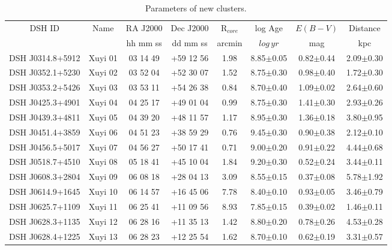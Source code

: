 \documentclass[]{raa_rb}
\begin{document}
\begin{table*}
\centering
\begin{minipage}{140mm}
\caption{Parameters of new clusters.}
\label{clusters_new}
\begin{tabular}{c|c|c|c|c|c|c|c}
\hline
\hline
  DSH ID          & Name        & RA J2000 & Dec J2000  &R$_{core}$& log Age           & $E(B-V)$      & Distance          \\ 
                  &             & hh mm ss &  dd mm ss  &arcmin& $log\,yr$       &  mag          & kpc               \\ \hline
DSH J0314.8+5912  & Xuyi 01     & 03 14 49 &  +59 12 56 & 1.98 & 8.85$\pm$0.05 & 0.82$\pm$0.44 &  2.09$\pm$0.30  \\
DSH J0352.1+5230  & Xuyi 02     & 03 52 04 &  +52 30 07 & 1.52 & 8.75$\pm$0.30 & 0.98$\pm$0.40 &  1.72$\pm$0.30  \\
DSH J0353.2+5426  & Xuyi 03     & 03 53 11 &  +54 26 38 & 0.84 & 8.70$\pm$0.40 & 1.09$\pm$0.02 &  2.64$\pm$0.60  \\
DSH J0425.3+4901  & Xuyi 04     & 04 25 17 &  +49 01 04 & 0.99 & 8.75$\pm$0.30 & 1.41$\pm$0.30 &  2.93$\pm$0.26  \\
DSH J0439.3+4811  & Xuyi 05     & 04 39 20 &  +48 11 57 & 1.17 & 8.95$\pm$0.30 & 1.36$\pm$0.18 &  3.80$\pm$0.95  \\
DSH J0451.4+3859  & Xuyi 06     & 04 51 23 &  +38 59 29 & 0.76 & 9.45$\pm$0.30 & 0.90$\pm$0.38 &  2.12$\pm$0.10  \\
DSH J0456.5+5017  & Xuyi 07     & 04 56 27 &  +50 17 41 & 0.71 & 9.00$\pm$0.20 & 0.91$\pm$0.22 &  4.44$\pm$0.68  \\
DSH J0518.7+4510  & Xuyi 08     & 05 18 41 &  +45 10 04 & 1.84 & 9.20$\pm$0.30 & 0.52$\pm$0.24 &  3.44$\pm$0.11  \\
DSH J0608.3+2804  & Xuyi 09     & 06 08 18 &  +28 04 13 & 3.09 & 8.55$\pm$0.15 & 0.37$\pm$0.08 &  5.78$\pm$1.92  \\
DSH J0614.9+1645  & Xuyi 10     & 06 14 57 &  +16 45 06 & 7.78 & 8.40$\pm$0.10 & 0.93$\pm$0.05 &  3.46$\pm$0.79  \\
DSH J0625.7+1109  & Xuyi 11     & 06 25 41 &  +11 09 56 & 8.93 & 7.85$\pm$0.15 & 0.39$\pm$0.02 &  1.46$\pm$0.11  \\
DSH J0628.3+1135  & Xuyi 12     & 06 28 16 &  +11 35 13 & 1.42 & 8.80$\pm$0.20 & 0.78$\pm$0.26 &  4.53$\pm$0.28  \\
DSH J0628.4+1225  & Xuyi 13     & 06 28 23 &  +12 25 54 & 1.62 & 8.70$\pm$0.10 & 0.62$\pm$0.19 &  3.31$\pm$0.57  \\

\end{tabular}
\end{minipage}
\end{table*}
\end{document}
